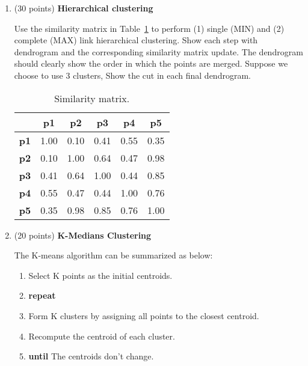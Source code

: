 \documentclass[11pt]{article}
\begin{document}
\begin{enumerate}

    \item (30 points) \textbf{Hierarchical clustering}

    Use the similarity matrix in Table~\ref{tb:exp1} to perform
    (1) single (MIN) and (2) complete (MAX) link hierarchical
    clustering. Show each step with dendrogram and the
    corresponding similarity matrix update. The dendrogram should
    clearly show the order in which the points are merged.
    Suppose we choose to use 3 clusters, Show the cut in each
    final dendrogram.

    \begin{table}[ht]\label{tb:exp1}
        \centering
        \caption{Similarity matrix.}

        \begin{tabular}{ l| c | c | c | c | c}\hline
                   & \textbf{p1} & \textbf{p2} & \textbf{p3} & \textbf{p4} & \textbf{p5} \\ \hline
            \bf p1 & 1.00        & 0.10        & 0.41        & 0.55        & 0.35        \\
            \bf p2 & 0.10        & 1.00        & 0.64        & 0.47        & 0.98        \\
            \bf p3 & 0.41        & 0.64        & 1.00        & 0.44        & 0.85        \\
            \bf p4 & 0.55        & 0.47        & 0.44        & 1.00        & 0.76        \\
            \bf p5 & 0.35        & 0.98        & 0.85        & 0.76        & 1.00        \\
            \hline
        \end{tabular}
    \end{table}

    \item (20 points) \textbf{K-Medians Clustering}
    
    The K-means algorithm can be summarized as below:
    \begin{enumerate}
        \item Select K points as the initial centroids.
        \item \textbf{repeat}
        \item \;\;\;\; Form K clusters by assigning all points to the closest centroid.
        \item \;\;\;\; Recompute the centroid of each cluster.
        \item \textbf{until} The centroids don't change.
    \end{enumerate}


\end{enumerate}
\end{document}
